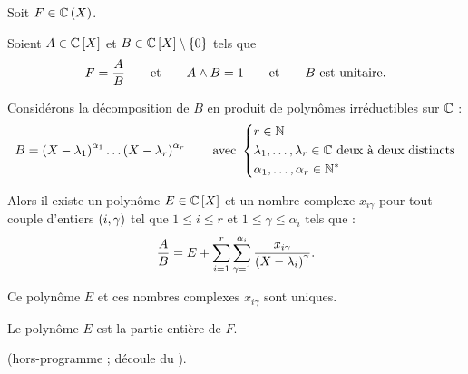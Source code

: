 \begin{theo}
Soit \(F\in\fracrat[\C]\).

Soient \(A\in\poly[\C]\) et \(B\in\poly[\C]\excluant\accol{0}\) tels que \[F=\dfrac{A}{B}\qquad\text{et}\qquad A\land B=1\qquad\text{et}\qquad B\text{ est unitaire}.\]

Considérons la décomposition de \(B\) en produit de polynômes irréductibles sur \(\mathbb{C}\) : \[B=\left(X-\lambda_1\right)^{\alpha_1}\dots\left(X-\lambda_r\right)^{\alpha_r}\qquad\text{avec }\begin{dcases}r\in\mathbb{N} \\ \lambda_1,\dots,\lambda_r\in\mathbb{C}\text{ deux à deux distincts} \\ \alpha_1,\dots,\alpha_r\in\mathbb{N}^*\end{dcases}\]

Alors il existe un polynôme \(E\in\poly[\C]\) et un nombre complexe \(x_{i\gamma}\) pour tout couple d'entiers \(\left(i,\gamma\right)\) tel que \(1\leq i\leq r\) et \(1\leq\gamma\leq\alpha_i\) tels que : \[\dfrac{A}{B}=E+\sum_{i=1}^r\sum_{\gamma=1}^{\alpha_i}\dfrac{x_{i\gamma}}{\left(X-\lambda_i\right)^\gamma}.\]

Ce polynôme \(E\) et ces nombres complexes \(x_{i\gamma}\) sont uniques.

Le polynôme \(E\) est la partie entière de \(F\).
\end{theo}

\begin{dem}
 (hors-programme ; découle du ).
\end{dem}

